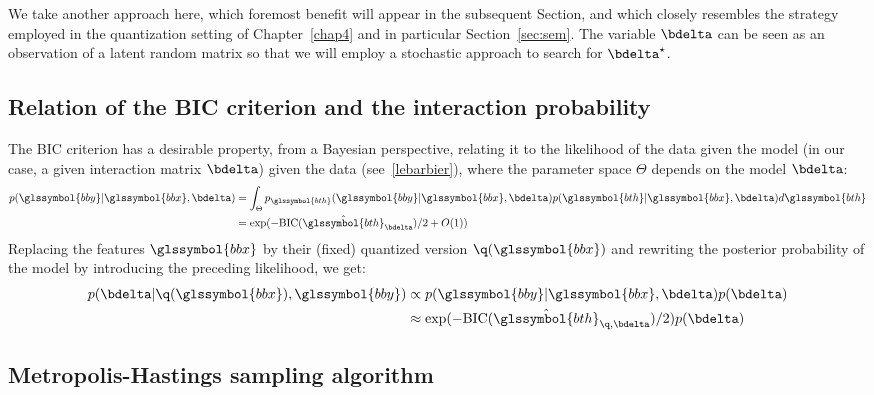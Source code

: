 We take another approach here, which foremost benefit will appear in the subsequent Section, and which closely resembles the strategy employed in the quantization setting of Chapter~\ref{chap4} and in particular Section~\ref{sec:sem}. The variable $\bdelta$ can be seen as an observation of a latent random matrix so that we will employ a stochastic approach to search for $\bdelta^\star$.

\subsection{Relation of the BIC criterion and the interaction probability}

The BIC criterion has a desirable property, from a Bayesian perspective, relating it to the likelihood of the data given the model (in our case, a given interaction matrix $\bdelta$) given the data (see~\ref{lebarbier}), where the parameter space $\Theta$ depends on the model $\bdelta$:
\begin{align*}
p(\glssymbol{bby} | \glssymbol{bbx}, \bdelta) & = \int_{\Theta} p_{\glssymbol{bth}}(\glssymbol{bby} | \glssymbol{bbx}, \bdelta) p(\glssymbol{bth} | \glssymbol{bbx}, \bdelta)d\glssymbol{bth} \\
& = \exp(-\text{BIC}(\hat{\glssymbol{bth}}_{\bdelta})/2 + O(1))
\end{align*}
Replacing the features $\glssymbol{bbx}$ by their (fixed) quantized version $\q(\glssymbol{bbx})$ and rewriting the posterior probability of the model by introducing the preceding likelihood, we get:
\begin{align*}
p(\bdelta | \q(\glssymbol{bbx}),\glssymbol{bby}) & \propto p(\glssymbol{bby} | \glssymbol{bbx}, \bdelta) p(\bdelta) \\
& \approx \exp(-\text{BIC}(\hat{\glssymbol{bth}}_{\q,\bdelta})/2) p(\bdelta)
\end{align*}

\subsection{Metropolis-Hastings sampling algorithm}




